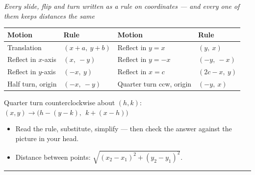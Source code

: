 \documentclass[12pt]{article}
\begin{document}

\begin{center}
\small\textit{Every slide, flip and turn written as a rule on coordinates --- and every one of them keeps distances the same}
\end{center}

\begin{center}
\footnotesize
\begin{tabular}{@{}ll@{\qquad}ll@{}}
\toprule
\textbf{Motion} & \textbf{Rule} & \textbf{Motion} & \textbf{Rule} \\
\midrule
Translation & $(x + a,\ y + b)$ & Reflect in $y = x$ & $(y,\ x)$ \\
Reflect in $x$-axis & $(x,\ -y)$ & Reflect in $y = -x$ & $(-y,\ -x)$ \\
Reflect in $y$-axis & $(-x,\ y)$ & Reflect in $x = c$ & $(2c - x,\ y)$ \\
Half turn, origin & $(-x,\ -y)$ & Quarter turn ccw, origin & $(-y,\ x)$ \\
\bottomrule
\end{tabular}
\par\vspace{0.12cm}
{\footnotesize Quarter turn counterclockwise about $(h, k)$: \ $(x, y) \to \bigl(h - (y - k),\ \ k + (x - h)\bigr)$}
\end{center}

\begin{itemize}[leftmargin=0.7cm, itemsep=1pt, topsep=2pt]
  \item Read the rule, substitute, simplify --- then check the answer against the picture in your head.
  \item Distance between points: $\sqrt{(x_2 - x_1)^2 + (y_2 - y_1)^2}$.
\end{itemize}

\vspace{0.1cm}
\noindent\rule{\linewidth}{0.4pt}

\end{document}
